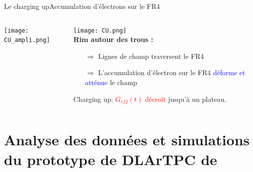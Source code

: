         \begin{frame}{Le charging up}{Accumulation d'électrons sur le FR4}
            \begin{scriptsize}
                \begin{columns}
           			\begin{column}{0.5\textwidth}
               			\texttt{[image: CU\_ampli.png]}
           			\end{column}\hfill
           			\begin{column}{0.5\textwidth}
           				\texttt{[image: CU.png]}\\\vspace{1cm}
               			\textbf{Rim autour des trous :}
           				\begin{itemize}
           					\item[$\Rightarrow$] Lignes de champ traversent le FR4\\
           					\item[$\Rightarrow$] L'accumulation d'électron sur le FR4 \textcolor{blue}{déforme et atténue} le champ
           				\end{itemize}
           				Charging up: \textcolor{red}{$G_{eff}(t)$ décroît} jusqu'à un plateau.
               		\end{column}
               	\end{columns}
            \end{scriptsize}
        \end{frame}

    
    
    \section[\TOO{}]{Analyse des données et simulations du prototype de DLArTPC de \TOO{}}
    
